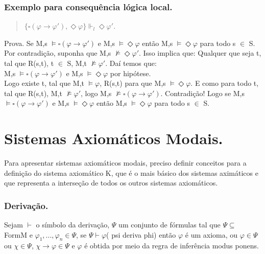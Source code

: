 \documentclass[12pt]{report}
\begin{document}
   \subsection{ Exemplo para consequência lógica local.}%
   \begin{quote}
   $ \{ \square (\varphi \rightarrow \varphi'), \Diamond \varphi \} \Vdash_{l}  \Diamond \varphi'$.
  \end{quote}
  Prova. Se M,s $\models \square (\varphi \rightarrow \varphi' )$ e M,s $ \models \Diamond \varphi $ então M,s $\models \Diamond \varphi $ para todo s $\in $ S.\\
  Por contradição, suponha que M,s $\nvDash \Diamond \varphi'$. Isso implica que: Qualquer que seja t, tal que R(s,t), t $\in$ S, M,t $\nvDash \varphi' $. Daí temos que:\\
  M,s $\models \square (\varphi \rightarrow \varphi ')$ e M,s $\models \Diamond \varphi $ por hipótese.\\
  Logo existe t, tal que M,t $\models \varphi $, R(s,t) para que M,s $\models \Diamond \varphi$. E como para todo t, tal que R(s,t), M,t $\nvDash \varphi '$, logo M,s $\nvDash \square (\varphi \rightarrow \varphi')$. Contradição! Logo se M,s $\models \square (\varphi \rightarrow \varphi' )$ e M,s $ \models \Diamond \varphi $ então M,s $\models \Diamond \varphi $ para todo s $\in $ S.
   
\chapter{Sistemas Axiomáticos Modais.}   
\hspace{0.5cm} Para apresentar sistemas axiomáticos modais, preciso definir conceitos para a definição do sistema axiomático K, que é o mais básico dos sistemas aximáticos e que representa a interseção de todos os outros sistemas axiomáticos. 
\subsection{Derivação.}%
\hspace{0.5cm}Sejam $\vdash$ o símbolo da derivação, $\Psi$ um conjunto de fórmulas tal que $\Psi\subseteq$ FormM e $\varphi_{1},...,\varphi_{n} \in \Psi$, se $\Psi \vdash \varphi$( psi deriva phi) então $\varphi$ é um axioma, ou $\varphi \in \Psi$ ou $\chi \in \Psi$, $\chi \rightarrow \varphi \in \Psi$ e $\varphi$ é obtida por meio da regra de inferência modus ponens.
\end{document}
